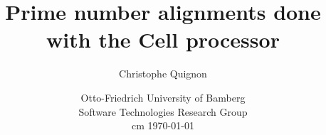 \documentclass[a4paper]{article}
\begin{document}
\title{%
	Prime number alignments done with the Cell processor}
\author{Christophe Quignon}
\date{Otto-Friedrich University of Bamberg\\
Software Technologies Research Group\\
 cm	
\today}

\maketitle


\noindent

\newpage
\tableofcontents
\newpage






%
\newpage



   
\end{document}
